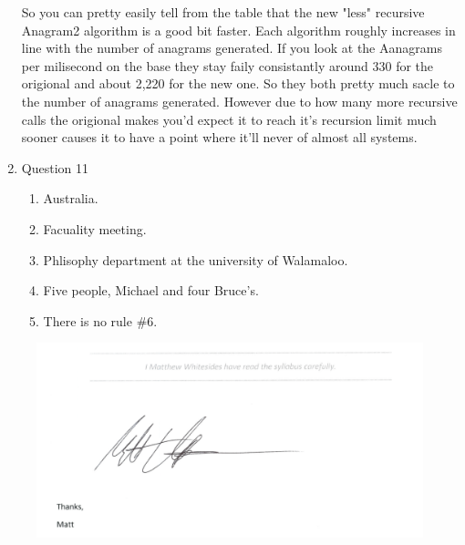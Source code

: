 \documentclass{article}
\begin{document}
\begin{enumerate}
    So you can pretty easily tell from the table that the new "less" recursive Anagram2 algorithm is a good bit faster. Each algorithm roughly increases in line with the number of anagrams generated. If you look at the Aanagrams per milisecond on the base they stay faily consistantly around 330 for the origional and about 2,220 for the new one. So they both pretty much sacle to the number of anagrams generated. However due to how many more recursive calls the origional makes you'd expect it to reach it's recursion limit much sooner causes it to have a point where it'll never of almost all systems.

  \pagebreak
  \item Question 11
  \begin{enumerate}
    \item Australia.
    \item Facuality meeting.
    \item Phlisophy department at the university of Walamaloo.
    \item Five people, Michael and four Bruce's. 
    \item There is no rule \#6.
  \end{enumerate}

\end{enumerate}

\pagebreak
\begin{figure}
  \includegraphics[width=\linewidth]{Statement.png}
  \label{fig:Statement}
\end{figure}
\end{document}
